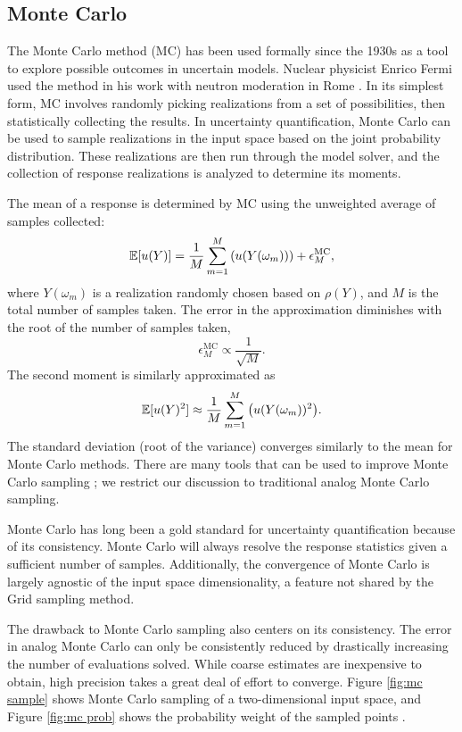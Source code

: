 \subsection{Monte Carlo}
The Monte Carlo method (MC) \cite{mc} has been used formally since the 1930s as a tool to explore possible outcomes
in uncertain models.  Nuclear physicist Enrico Fermi used the method in his work with neutron moderation in
Rome \cite{mcfermi}.  In its simplest form, MC involves randomly picking realizations from a set of
possibilities, then statistically collecting the results.  In uncertainty quantification, Monte Carlo can be
used to sample realizations in the input space based on the joint probability distribution.  These
realizations are then run through the model solver, and the collection of
response realizations is analyzed to determine its moments.

The mean of a response is determined by MC using the unweighted average of samples collected:
\begin{equation}
  \mathbb{E}[ u(Y)] = \frac{1}{M}\sum_{m=1}^M \qty(u(Y(\omega_m))) + \epsilon_M^{\text{MC}},
\end{equation}
where $Y(\omega_m)$ is a realization randomly chosen based on $\rho(Y)$, and $M$ is the total number of samples taken.
The error in the approximation diminishes with the root of the number of samples taken,
\begin{equation}
  \epsilon_M^{\text{MC}} \propto \frac{1}{\sqrt{M}}.
\end{equation}
The second moment is similarly approximated as
\begin{equation}
  \mathbb{E}[ u(Y)^2] \approx \frac{1}{M}\sum_{m=1}^M \qty(u(Y(\omega_m))^2).
\end{equation}
The standard deviation (root of the variance) converges similarly to the mean for Monte Carlo methods.  There
are many tools that can be used to improve Monte Carlo sampling \cite{mcvarred}\cite{mcnpvarred}; we restrict
our discussion to traditional analog Monte Carlo sampling.

Monte Carlo has long been a gold standard for uncertainty quantification because of its consistency.  Monte
Carlo will always resolve the response statistics given a sufficient number of samples.  Additionally, the
convergence of Monte Carlo is largely agnostic of the input space dimensionality, a feature not shared by the
Grid sampling method.

The drawback to Monte Carlo sampling also centers on its consistency.  The error in analog Monte Carlo can only be
consistently reduced by drastically increasing the number of evaluations solved.  While coarse estimates are
inexpensive to obtain, high precision takes a great deal of effort to converge.
Figure \ref{fig:mc sample}
shows Monte Carlo sampling of a two-dimensional input space, and Figure \ref{fig:mc prob} shows the
probability weight of the sampled points \cite{raven}.

